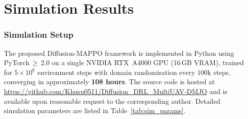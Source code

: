 \documentclass[journal]{IEEEtran}
\begin{document}
\section{Simulation Results}
\label{section_V}

\subsubsection{Simulation Setup}
The proposed Diffusion-MAPPO framework is implemented in Python 
using PyTorch\,$\geq$\,2.0 on a single NVIDIA RTX~A4000 GPU 
(16\,GB VRAM), trained for $5\times10^{6}$ environment steps 
with domain randomisation every $100$k steps, converging in 
approximately \textbf{108 hours}. The source code is hosted at 
\textcolor{blue}{\url{https://github.com/Khusu0511/Diffusion_DRL_MultiUAV-DMJO}} 
and is available upon reasonable request to the corresponding 
author. Detailed simulation parameters are listed in 
Table~\ref{tab:sim_params}.
\end{document}
